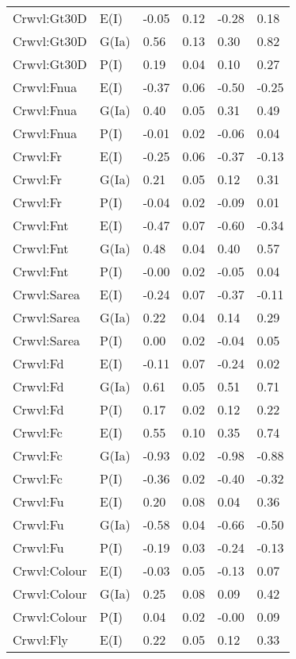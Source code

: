\begin{center}
\begin{longtable}{|p{1.1in}|p{0.7in}|p{0.7in}|p{0.6in}|p{0.6in}|p{0.6in}|}
  Crwvl:Gt30D & E(I) & -0.05 & 0.12 & -0.28 & 0.18 \\ 
  Crwvl:Gt30D & G(Ia) & 0.56 & 0.13 & 0.30 & 0.82 \\ 
  Crwvl:Gt30D & P(I) & 0.19 & 0.04 & 0.10 & 0.27 \\ 
  Crwvl:Fnua & E(I) & -0.37 & 0.06 & -0.50 & -0.25 \\ 
  Crwvl:Fnua & G(Ia) & 0.40 & 0.05 & 0.31 & 0.49 \\ 
  Crwvl:Fnua & P(I) & -0.01 & 0.02 & -0.06 & 0.04 \\ 
  Crwvl:Fr & E(I) & -0.25 & 0.06 & -0.37 & -0.13 \\ 
  Crwvl:Fr & G(Ia) & 0.21 & 0.05 & 0.12 & 0.31 \\ 
  Crwvl:Fr & P(I) & -0.04 & 0.02 & -0.09 & 0.01 \\ 
  Crwvl:Fnt & E(I) & -0.47 & 0.07 & -0.60 & -0.34 \\ 
  Crwvl:Fnt & G(Ia) & 0.48 & 0.04 & 0.40 & 0.57 \\ 
  Crwvl:Fnt & P(I) & -0.00 & 0.02 & -0.05 & 0.04 \\ 
  Crwvl:Sarea & E(I) & -0.24 & 0.07 & -0.37 & -0.11 \\ 
  Crwvl:Sarea & G(Ia) & 0.22 & 0.04 & 0.14 & 0.29 \\ 
  Crwvl:Sarea & P(I) & 0.00 & 0.02 & -0.04 & 0.05 \\ 
  Crwvl:Fd & E(I) & -0.11 & 0.07 & -0.24 & 0.02 \\ 
  Crwvl:Fd & G(Ia) & 0.61 & 0.05 & 0.51 & 0.71 \\ 
  Crwvl:Fd & P(I) & 0.17 & 0.02 & 0.12 & 0.22 \\ 
  Crwvl:Fc & E(I) & 0.55 & 0.10 & 0.35 & 0.74 \\ 
  Crwvl:Fc & G(Ia) & -0.93 & 0.02 & -0.98 & -0.88 \\ 
  Crwvl:Fc & P(I) & -0.36 & 0.02 & -0.40 & -0.32 \\ 
  Crwvl:Fu & E(I) & 0.20 & 0.08 & 0.04 & 0.36 \\ 
  Crwvl:Fu & G(Ia) & -0.58 & 0.04 & -0.66 & -0.50 \\ 
  Crwvl:Fu & P(I) & -0.19 & 0.03 & -0.24 & -0.13 \\ 
  Crwvl:Colour & E(I) & -0.03 & 0.05 & -0.13 & 0.07 \\ 
  Crwvl:Colour & G(Ia) & 0.25 & 0.08 & 0.09 & 0.42 \\ 
  Crwvl:Colour & P(I) & 0.04 & 0.02 & -0.00 & 0.09 \\ 
  Crwvl:Fly & E(I) & 0.22 & 0.05 & 0.12 & 0.33 \\ 

\end{longtable}
\end{center}

